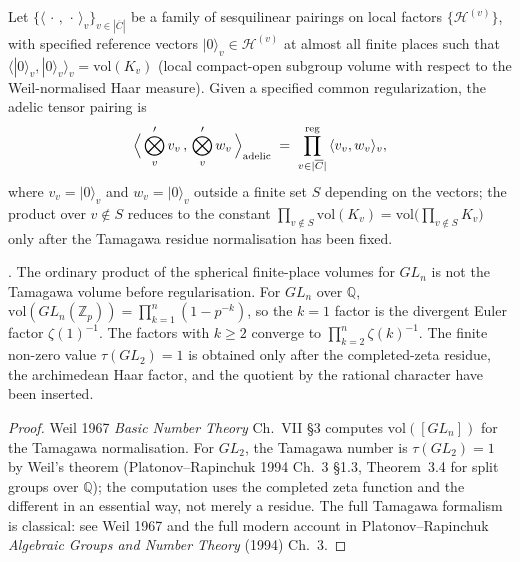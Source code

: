 \begin{definition}
\label{v4-arith:kp:def:adelic-pairing}
Let \(\{\langle\,\cdot\,,\,\cdot\,\rangle_{v}\}_{v\in|\overline{C}|}\)
be a family of sesquilinear pairings on local factors
\(\{\mathcal{H}^{(v)}\}\), with specified reference vectors
\(|0\rangle_{v}\in\mathcal{H}^{(v)}\) at almost all finite places
such that \(\langle|0\rangle_{v},|0\rangle_{v}\rangle_{v}=\mathrm{vol}(K_{v})\)
(local compact-open subgroup volume with respect to the
Weil-normalised Haar measure). Given a specified common regularization, the adelic tensor
pairing is
\begin{equation}
\label{v4-arith:kp:eq:adelic-restricted-tensor}
\Bigl\langle\,\bigotimes_{v}'v_{v}\,,\,\bigotimes_{v}'w_{v}\,\Bigr\rangle_{\mathrm{adelic}}
\;=\;
\mathop{\prod_{v\in|\overline{C}|}}^{\mathrm{reg}}\,\langle v_{v},w_{v}\rangle_{v},
\end{equation}
where \(v_{v}=|0\rangle_{v}\) and \(w_{v}=|0\rangle_{v}\) outside a
finite set \(S\) depending on the vectors; the product over \(v\notin S\)
reduces to the constant
\(\prod_{v\notin S}\mathrm{vol}(K_{v})=\mathrm{vol}\bigl(\prod_{v\notin S}K_{v}\bigr)\)
only after the Tamagawa residue normalisation has been fixed.
\end{definition}

\begin{lemma}
\label{v4-arith:kp:lem:adelic-convergence}
\ClaimStatusProvedElsewhere. The ordinary product of the spherical
finite-place volumes for \(GL_{n}\) is not the Tamagawa volume before
regularisation. For \(GL_{n}\) over \(\mathbb{Q}\),
\(\mathrm{vol}(GL_{n}(\mathbb{Z}_{p}))=\prod_{k=1}^{n}(1-p^{-k})\),
so the \(k=1\) factor is the divergent Euler factor
\(\zeta(1)^{-1}\). The factors with \(k\geq2\) converge to
\(\prod_{k=2}^{n}\zeta(k)^{-1}\). The finite non-zero value
\(\tau(GL_{2})=1\) is obtained only after the completed-zeta residue,
the archimedean Haar factor, and the quotient by the rational
character have been inserted.
\end{lemma}

\begin{proof}
Weil 1967 \emph{Basic Number Theory} Ch.~VII \S3 computes
\(\mathrm{vol}([GL_{n}])\) for the Tamagawa normalisation. For
\(GL_{2}\), the Tamagawa number is \(\tau(GL_{2})=1\) by Weil's theorem
(Platonov--Rapinchuk 1994 Ch.~3 \S1.3, Theorem~3.4 for split groups
over \(\mathbb{Q}\)); the computation uses the completed zeta function
and the different in an essential way, not merely a residue.
The full Tamagawa formalism is
classical: see Weil 1967 and the full modern account in
Platonov--Rapinchuk \emph{Algebraic Groups and Number Theory}
(1994) Ch.~3.
\end{proof}

